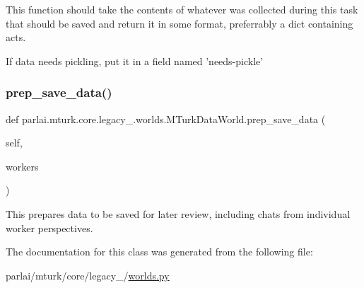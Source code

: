 \begin{DoxyVerb}This function should take the contents of whatever was collected during this
task that should be saved and return it in some format, preferrably a dict
containing acts.

If data needs pickling, put it in a field named 'needs-pickle'
\end{DoxyVerb}
 \mbox{\label{classparlai_1_1mturk_1_1core_1_1legacy__2018_1_1worlds_1_1MTurkDataWorld_ab0fd2eeab0ed799e565c5e97694cd135}} 
\subsubsection{\texorpdfstring{prep\+\_\+save\+\_\+data()}{prep\_save\_data()}}
{\footnotesize\ttfamily def parlai.\+mturk.\+core.\+legacy\+\_.\+worlds.\+M\+Turk\+Data\+World.\+prep\+\_\+save\+\_\+data (\begin{DoxyParamCaption}\item[{}]{self,  }\item[{}]{workers }\end{DoxyParamCaption})}

\begin{DoxyVerb}This prepares data to be saved for later review, including chats from individual
worker perspectives.
\end{DoxyVerb}
 

The documentation for this class was generated from the following file\+:\begin{DoxyCompactItemize}
\item 
parlai/mturk/core/legacy\+\_/\hyperlink{parlai_2mturk_2core_2legacy__2018_2worlds_8py}{worlds.\+py}\end{DoxyCompactItemize}
